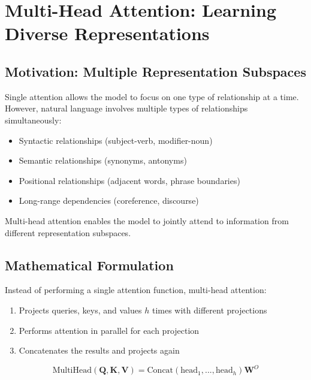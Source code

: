
\section{Multi-Head Attention: Learning Diverse Representations}

\subsection{Motivation: Multiple Representation Subspaces}

Single attention allows the model to focus on one type of relationship at a time. However, natural language involves multiple types of relationships simultaneously:
\begin{itemize}
    \item Syntactic relationships (subject-verb, modifier-noun)
    \item Semantic relationships (synonyms, antonyms)
    \item Positional relationships (adjacent words, phrase boundaries)
    \item Long-range dependencies (coreference, discourse)
\end{itemize}

Multi-head attention enables the model to jointly attend to information from different representation subspaces.

\subsection{Mathematical Formulation}

Instead of performing a single attention function, multi-head attention:
\begin{enumerate}
    \item Projects queries, keys, and values $h$ times with different projections
    \item Performs attention in parallel for each projection
    \item Concatenates the results and projects again
\end{enumerate}

\begin{equation}
\text{MultiHead}(\mathbf{Q}, \mathbf{K}, \mathbf{V}) = \text{Concat}(\text{head}_1, ..., \text{head}_h)\mathbf{W}^O
\end{equation}

